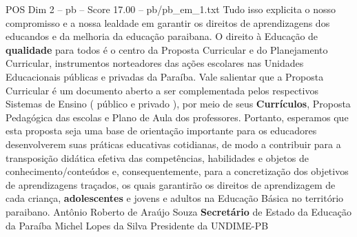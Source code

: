 \begin{textsample}{POS Dim 2 – pb – Score 17.00 – pb/pb\_em\_1.txt}
Tudo isso explicita o nosso compromisso e a nossa lealdade em garantir os direitos de aprendizagens dos educandos e da melhoria da educação paraibana.
O direito à Educação de \textbf{qualidade} para todos é o centro da Proposta Curricular e do Planejamento Curricular, instrumentos norteadores das ações escolares nas Unidades Educacionais públicas e privadas da Paraíba.
Vale salientar que a Proposta Curricular é um documento aberto a ser complementada pelos respectivos Sistemas de Ensino ( público e privado ), por meio de seus \textbf{Currículos}, Proposta Pedagógica das escolas e Plano de Aula dos professores.
Portanto, esperamos que esta proposta seja uma base de orientação importante para os educadores desenvolverem suas práticas educativas cotidianas, de modo a contribuir para a transposição didática efetiva das competências, habilidades e objetos de conhecimento/conteúdos e, consequentemente, para a concretização dos objetivos de aprendizagens traçados, os quais garantirão os direitos de aprendizagem de cada criança, \textbf{adolescentes} e jovens e adultos na Educação Básica no território paraibano.
Antônio Roberto de Araújo Souza \textbf{Secretário} de Estado da Educação da Paraíba Michel Lopes da Silva Presidente da UNDIME-PB

\end{textsample}
